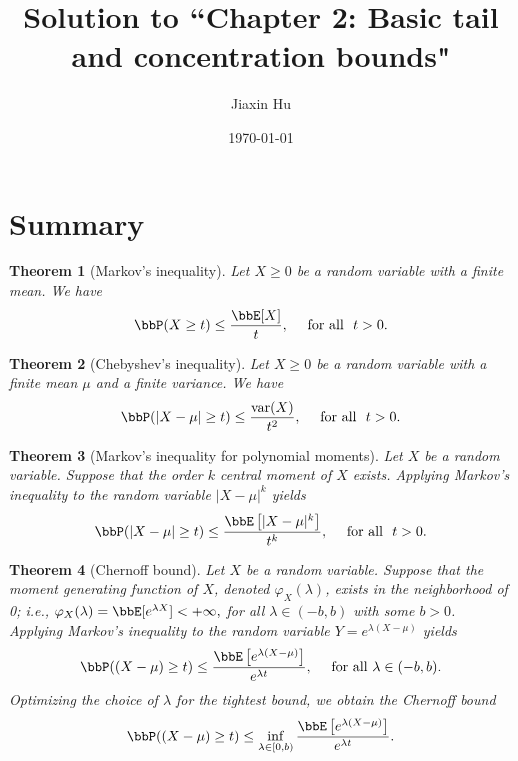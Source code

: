 \documentclass[11pt]{article}
\title{Solution to ``Chapter 2: Basic tail and concentration bounds"}
\date{\today}
\author{%
Jiaxin Hu
}
\DeclareMathOperator{\var}{var}
\theoremstyle{plain}
\newtheorem{thm}{Theorem}[section]
\theoremstyle{definition}
\begin{document}

\maketitle

\section{Summary}
\begin{thm}[Markov's inequality]\label{thm:markov}
	Let $X \geq 0$ be a random variable  with a finite mean. We have
	\begin{equation}\label{eq:thmmarkov}
		\bbP(X\geq t) \leq \frac{\bbE[X]}{t},\quad \text{ for all } \ t > 0.
	\end{equation}  
\end{thm}

\begin{thm}[Chebyshev's inequality]\label{thm:cheb}
	Let $X \geq 0$ be a random variable  with a finite mean $\mu$ and a finite variance. We have
	\begin{equation}\label{eq:cheby}
		\bbP(|X - \mu |\geq t) \leq \frac{\var(X)}{t^2},\quad \text{ for all } \ t > 0.
	\end{equation}  
\end{thm}

\begin{thm}[Markov's inequality for polynomial moments]\label{thm:polymoment}
	Let $X$ be a random variable. Suppose that the order $k$ central moment of $X$ exists. Applying Markov's inequality to the random variable $|X - \mu|^k$ yields
	\begin{equation}\label{eq:poly}
		\bbP(|X - \mu |\geq t) \leq \frac{\bbE\left[|X-\mu|^k\right]}{t^k},\quad \text{ for all } \ t > 0.
	\end{equation}  
\end{thm}

\begin{thm}[Chernoff bound]\label{thm:chernoff}
 Let $X$ be a random variable. Suppose that the moment generating function of $X$, denoted $\varphi_X(\lambda)$, exists in the neighborhood of 0; i.e., $\varphi_X(\lambda) = \bbE[e^{\lambda X}] < +\infty,$ for all $\lambda \in (-b,b)$ with some $b>0$. Applying Markov's inequality to the random variable $Y = e^{\lambda(X- \mu)}$ yields
	\begin{equation}\label{eq:chernoff1}
		\bbP((X - \mu) \geq t) \leq \frac{\bbE\left[e^{\lambda (X-\mu)}\right]}{e^{\lambda t}}, \quad \text{ for all } \lambda\in (-b,b).
	\end{equation}
	Optimizing the choice of $\lambda$ for the tightest bound, we obtain the Chernoff bound
	\begin{equation}\label{eq:chernoff2}
		\bbP((X - \mu) \geq t) \leq \inf_{\lambda \in [0,b)} \frac{\bbE\left[e^{\lambda (X-\mu)}\right]}{e^{\lambda t}}.
	\end{equation}
\end{thm}
\end{document}
